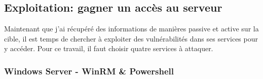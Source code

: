\documentclass[a4paper]{article}
\begin{document}
\newpage \subsection{Exploitation: gagner un accès au serveur}





Maintenant que j'ai récupéré des informations de manières passive et active sur la cible, il est temps de chercher à exploiter des vulnérabilités dans ses services pour y accéder. Pour ce travail, il faut choisir quatre services à attaquer.





\subsubsection{Windows Server - WinRM \& Powershell}
\end{document}
